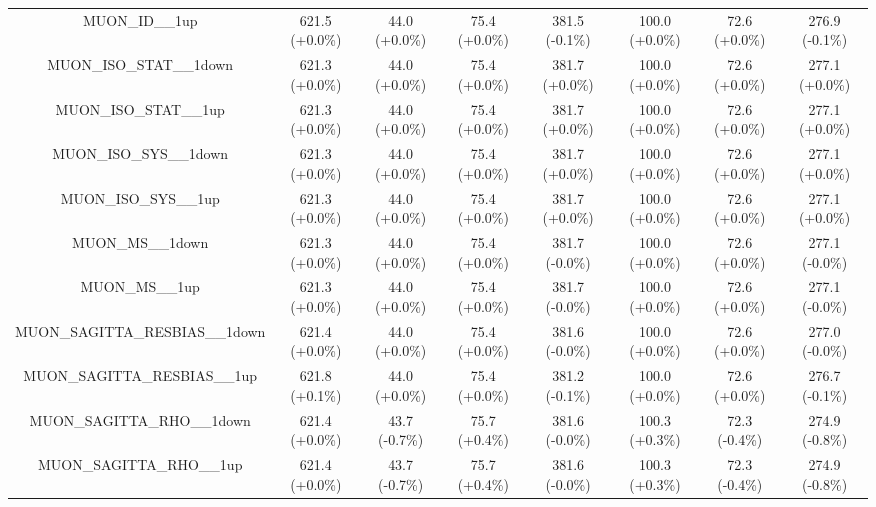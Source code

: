 \begin{table}[htbp!]
\begin{tiny}
\begin{center}
\begin{tabular}{c|c|c|c||c|c|c|c}
MUON\_ID\_\_1up                                              & 621.5     (+0.0\%) & 44.0      (+0.0\%) & 75.4      (+0.0\%) & 381.5     (-0.1\%) & 100.0     (+0.0\%) & 72.6      (+0.0\%) & 276.9     (-0.1\%) \\ 
MUON\_ISO\_STAT\_\_1down                                     & 621.3     (+0.0\%) & 44.0      (+0.0\%) & 75.4      (+0.0\%) & 381.7     (+0.0\%) & 100.0     (+0.0\%) & 72.6      (+0.0\%) & 277.1     (+0.0\%) \\ 
MUON\_ISO\_STAT\_\_1up                                       & 621.3     (+0.0\%) & 44.0      (+0.0\%) & 75.4      (+0.0\%) & 381.7     (+0.0\%) & 100.0     (+0.0\%) & 72.6      (+0.0\%) & 277.1     (+0.0\%) \\ 
MUON\_ISO\_SYS\_\_1down                                      & 621.3     (+0.0\%) & 44.0      (+0.0\%) & 75.4      (+0.0\%) & 381.7     (+0.0\%) & 100.0     (+0.0\%) & 72.6      (+0.0\%) & 277.1     (+0.0\%) \\ 
MUON\_ISO\_SYS\_\_1up                                        & 621.3     (+0.0\%) & 44.0      (+0.0\%) & 75.4      (+0.0\%) & 381.7     (+0.0\%) & 100.0     (+0.0\%) & 72.6      (+0.0\%) & 277.1     (+0.0\%) \\ 
MUON\_MS\_\_1down                                            & 621.3     (+0.0\%) & 44.0      (+0.0\%) & 75.4      (+0.0\%) & 381.7     (-0.0\%) & 100.0     (+0.0\%) & 72.6      (+0.0\%) & 277.1     (-0.0\%) \\ 
MUON\_MS\_\_1up                                              & 621.3     (+0.0\%) & 44.0      (+0.0\%) & 75.4      (+0.0\%) & 381.7     (-0.0\%) & 100.0     (+0.0\%) & 72.6      (+0.0\%) & 277.1     (-0.0\%) \\ 
MUON\_SAGITTA\_RESBIAS\_\_1down                              & 621.4     (+0.0\%) & 44.0      (+0.0\%) & 75.4      (+0.0\%) & 381.6     (-0.0\%) & 100.0     (+0.0\%) & 72.6      (+0.0\%) & 277.0     (-0.0\%) \\ 
MUON\_SAGITTA\_RESBIAS\_\_1up                                & 621.8     (+0.1\%) & 44.0      (+0.0\%) & 75.4      (+0.0\%) & 381.2     (-0.1\%) & 100.0     (+0.0\%) & 72.6      (+0.0\%) & 276.7     (-0.1\%) \\ 
MUON\_SAGITTA\_RHO\_\_1down                                  & 621.4     (+0.0\%) & 43.7      (-0.7\%) & 75.7      (+0.4\%) & 381.6     (-0.0\%) & 100.3     (+0.3\%) & 72.3      (-0.4\%) & 274.9     (-0.8\%) \\ 
MUON\_SAGITTA\_RHO\_\_1up                                    & 621.4     (+0.0\%) & 43.7      (-0.7\%) & 75.7      (+0.4\%) & 381.6     (-0.0\%) & 100.3     (+0.3\%) & 72.3      (-0.4\%) & 274.9     (-0.8\%) \\ 

\end{tabular}
\end{center}
\end{tiny}
\end{table}
